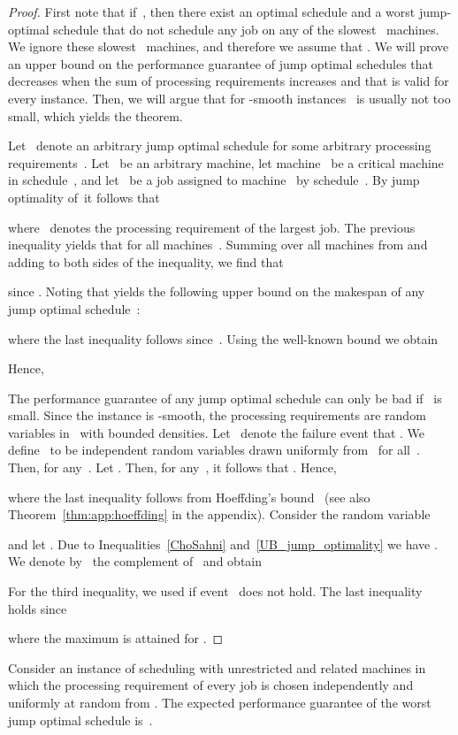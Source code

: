 \documentclass[a4paper,11pt,fleqn]{article}
\begin{document}
\begin{proof}
First note that if~, then there exist an optimal schedule and a worst
jump-optimal schedule that do not schedule any job on any of the
slowest~ machines. We ignore these slowest~ machines, and therefore
we assume that .
We will prove an upper bound on the performance guarantee of jump optimal schedules
that decreases when the sum of processing requirements  increases and that is valid for every instance. Then, we will argue that for -smooth instances~ is usually not too small, which
yields the theorem.

Let~ denote an arbitrary jump optimal schedule for some arbitrary processing requirements~. Let~ be an arbitrary machine, let machine~ be a critical machine in schedule~, and let~ be a job assigned to machine~ by schedule~\sched. By jump optimality of~\sched it follows that

where~ denotes the processing requirement of the largest job. The previous inequality yields that  for
all machines~.
Summing over all machines from  and adding
 to both sides of the inequality, we find that

since . Noting that  yields the following upper bound on the makespan of any jump optimal schedule~:

where the last inequality follows since~. Using the well-known bound  we obtain

Hence,

The performance guarantee of any jump optimal schedule can only be bad if~ is small. Since the instance is -smooth, the processing requirements are random
variables in~ with bounded densities.
Let~ denote the failure event that .
We define~ to be independent random variables drawn uniformly from~ for all~. Then,
 for any~. 
Let . Then, for any~,
it follows that . Hence,

where the last inequality follows from Hoeffding's bound~\cite{Hoeffding:1963} (see also Theorem~\ref{thm:app:hoeffding} in the appendix). Consider the random variable

and let . Due to Inequalities~\eqref{ChoSahni} and~\eqref{UB_jump_optimality} we have . We denote by~ the complement of~ and obtain
 
For the third inequality, we used  if event~ does not hold. The last inequality holds since 

where the maximum is attained for .
\end{proof}


\begin{cor}
Consider an instance of scheduling with unrestricted and related machines in which the processing requirement of every job is chosen independently and uniformly at random from . The expected performance guarantee of the worst jump optimal schedule is~.
\end{cor}
\end{document}
